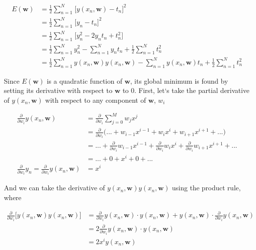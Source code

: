 \documentclass{article}
\begin{document}
\begin{align*}
    E(\mathbf{w}) &= \frac{1}{2}\sum_{n=1}^N \hspace{1pt} \big[y(x_n, \mathbf{w}) - t_n \big]^2 \\
                  &= \frac{1}{2}\sum_{n=1}^N \hspace{1pt} \big[y_n - t_n \big]^2 \\
                  &= \frac{1}{2}\sum_{n=1}^N \hspace{1pt} \big[y_n^2 - 2y_nt_n + t_n^2 \big] \\
                  &= \frac{1}{2}\sum_{n=1}^N y_n^2 - \sum_{n=1}^Ny_nt_n + \frac{1}{2}\sum_{n=1}^Nt_n^2 \\
                  &= \frac{1}{2}\sum_{n=1}^N y(x_n, \mathbf{w})y(x_n, \mathbf{w}) - \sum_{n=1}^Ny(x_n, \mathbf{w})t_n + \frac{1}{2}\sum_{n=1}^Nt_n^2
\end{align*}

Since $E(\mathbf{w})$ is a quadratic function of $\mathbf{w}$, its global minimum is found by setting its derivative with respect to $\mathbf{w}$ to 0. First, let`s take the partial derivative of $y(x_n, \mathbf{w})$ with respect to any component of $\mathbf{w}$, $w_i$

\begin{align*}
    \frac{\partial}{\partial w_i}y(x_n, \mathbf{w}) &= \frac{\partial}{\partial w_i} \sum_{j=0}^Mw_jx^j \\
                                                    &= \frac{\partial}{\partial w_i} \bigg(... + w_{i-1}x^{i-1} + w_ix^i + w_{i+1}x^{i+1} + ... \bigg) \\
                                                    &= ... + \frac{\partial}{\partial w_i}w_{i-1}x^{i-1} + \frac{\partial}{\partial w_i}w_ix^i + \frac{\partial}{\partial w_i}w_{i+1}x^{i+1} + ... \\
                                                    &= ... + 0 + x^i + 0 + ... \\
    \frac{\partial}{\partial w_i}y_n = \frac{\partial}{\partial w_i}y(x_n, \mathbf{w}) &= x^i
\end{align*}

And we can take the derivative of $y(x_n, \mathbf{w})y(x_n, \mathbf{w})$ using the product rule, where

\begin{align*}
    \frac{\partial}{\partial w_i} \big[y(x_n, \mathbf{w}) y(x_n, \mathbf{w}) \big] &= \frac{\partial}{\partial w_i}y(x_n, \mathbf{w}) \cdot y(x_n, \mathbf{w}) + y(x_n, \mathbf{w}) \cdot \frac{\partial}{\partial w_i}y(x_n, \mathbf{w}) \\
                                                                                   &= 2 \frac{\partial}{\partial w_i} y(x_n, \mathbf{w}) \cdot y(x_n, \mathbf{w}) \\
                                                                                   &= 2 x^i y(x_n, \mathbf{w})
\end{align*}
\end{document}
